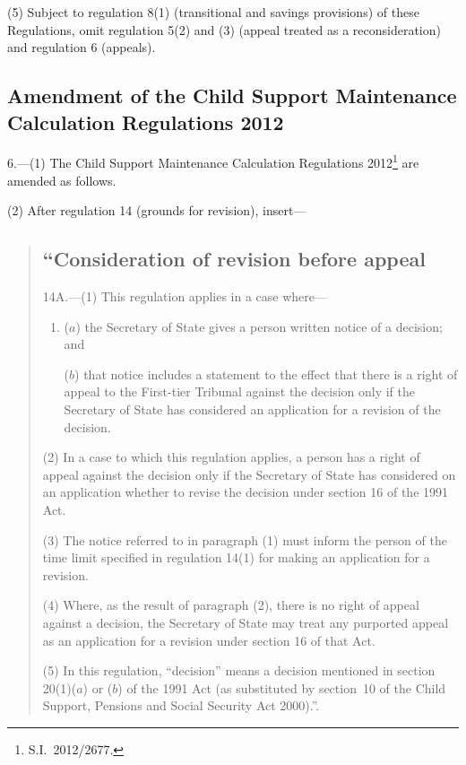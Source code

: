 \documentclass[12pt,a4paper]{article}
\begin{document}
(5) Subject to regulation 8(1) (transitional and savings provisions) of these Regulations, omit regulation 5(2) and (3) (appeal treated as a reconsideration) and regulation 6 (appeals).

\subsection[6. Amendment of the Child Support Maintenance Calculation Regulations 2012]{Amendment of the Child Support Maintenance Calculation Regulations 2012}

6.---(1)  The Child Support Maintenance Calculation Regulations 2012\footnote{S.I.~2012/2677.} are amended as follows.

(2) After regulation 14 (grounds for revision), insert—
\begin{quotation}
\subsection*{“Consideration of revision before appeal}

14A.---(1)  This regulation applies in a case where—
\begin{enumerate}\item[]
($a$) the Secretary of State gives a person written notice of a decision; and

($b$) that notice includes a statement to the effect that there is a right of appeal to the First-tier Tribunal against the decision only if the Secretary of State has considered an application for a revision of the decision.
\end{enumerate}

(2) In a case to which this regulation applies, a person has a right of appeal against the decision only if the Secretary of State has considered on an application whether to revise the decision under section 16 of the 1991 Act.

(3) The notice referred to in paragraph (1) must inform the person of the time limit specified in regulation 14(1) for making an application for a revision.

(4) Where, as the result of paragraph (2), there is no right of appeal against a decision, the Secretary of State may treat any purported appeal as an application for a revision under section 16 of that Act.

(5) In this regulation, “decision” means a decision mentioned in section 20(1)($a$)  or ($b$)  of the 1991 Act (as substituted by section~10 of the Child Support, Pensions and Social Security Act 2000).”.
\end{quotation}
\end{document}
